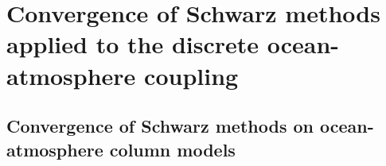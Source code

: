 \chapter{Convergence of Schwarz methods applied to the
discrete ocean-atmosphere coupling}
\label{ch:OASchwarz}
\minitoc

\section{Convergence of Schwarz methods on ocean-atmosphere column models}

